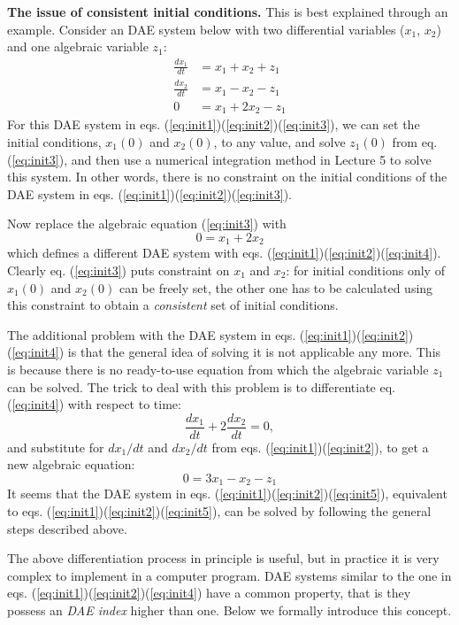 \documentclass[a4paper,11pt]{article}
\theoremstyle{definition}
\begin{document}
\textbf{The issue of consistent initial conditions.} This is best explained through an example. Consider an DAE system below with two differential variables ($x_1$, $x_2$)
and one algebraic variable $z_1$:
\begin{align}
	\frac{d x_1}{d t} &= x_1 + x_2 + z_1 \label{eq:init1} \\
	\frac{d x_2}{d t} &= x_1 - x_2 - z_1 \label{eq:init2} \\
	0 &= x_1 + 2 x_2 - z_1 \label{eq:init3} 
\end{align}
\noindent For this DAE system in eqs. (\ref{eq:init1})(\ref{eq:init2})(\ref{eq:init3}),
we can set the initial conditions, $x_1(0)$ and $x_2(0)$, to any value, and solve
$z_1(0)$ from eq. (\ref{eq:init3}), and then use a numerical integration method in Lecture 5 to solve this system. In other words, there is no constraint on the initial conditions of the DAE system in eqs. (\ref{eq:init1})(\ref{eq:init2})(\ref{eq:init3}).

Now replace the algebraic equation  (\ref{eq:init3}) with
\begin{equation} \label{eq:init4}
	0 = x_1 + 2 x_2
\end{equation}
\noindent which defines a different DAE system with eqs. (\ref{eq:init1})(\ref{eq:init2})(\ref{eq:init4}). Clearly eq. (\ref{eq:init3}) puts constraint on $x_1$ and $x_2$:
 for initial conditions only of $x_1(0)$ and $x_2(0)$ can be freely set, the other one has to
 be calculated using this constraint to obtain a \emph{consistent} set of initial conditions.

The additional problem with the  DAE system in eqs. (\ref{eq:init1})(\ref{eq:init2})(\ref{eq:init4}) is that the general idea of solving it is not applicable any more.
This is because there is no ready-to-use equation from which the algebraic variable
$z_1$ can be solved. The trick to deal with this problem is to differentiate
eq. (\ref{eq:init4}) with respect to time:
\[ \frac{d x_1}{d t} + 2 \frac{d x_2}{d t} = 0, \]
and substitute for $d x_1 / d t$ and $d x_2 / d t$ from 
eqs. (\ref{eq:init1})(\ref{eq:init2}), to get a new algebraic equation:
\begin{equation} \label{eq:init5}
	0 = 3 x_1 - x_2 - z_1
\end{equation}
\noindent It seems that the DAE system in eqs. (\ref{eq:init1})(\ref{eq:init2})(\ref{eq:init5}), equivalent to eqs. (\ref{eq:init1})(\ref{eq:init2})(\ref{eq:init5}),
can be solved by following the general steps described above. 

The above differentiation process in principle is useful, but in practice it is
very complex to implement in a computer program. DAE systems similar to the one in eqs. (\ref{eq:init1})(\ref{eq:init2})(\ref{eq:init4}) have a common property, that is
they possess an \emph{DAE index} higher than one. Below we formally introduce
this concept.
\end{document}
